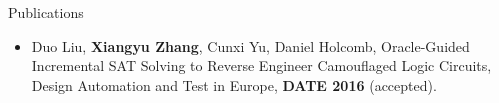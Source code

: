 \documentclass{resume} %
\begin{document}
\begin{rSection}{Publications}\itemsep 2pt
\begin{itemize}
\item Duo Liu, \textbf{Xiangyu Zhang}, Cunxi Yu, Daniel Holcomb, Oracle-Guided Incremental SAT Solving to Reverse Engineer Camouflaged Logic Circuits, Design Automation and Test in Europe, \textbf{DATE 2016} (accepted).
\end{itemize}
\end{rSection}
\end{document}
